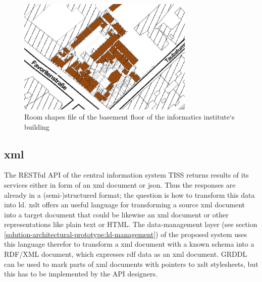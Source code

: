 \documentclass[draft,final]{vutinfth} %
\begin{document}
\begin{figure}[h]
    \centering
    \includegraphics[width=0.75\textwidth]{graphics/qgis-floor-plan-building-h-eg.png}
    \caption{Room shapes file of the basement floor of the informatics institute`s building}
    \label{fig:solution-data-acquisition:tuvienna-lib-gm-indoor}
\end{figure}

\subsection{\gls{xml}}
\label{solution-data-acquisition-xml}

The RESTful API of the central information system TISS returns results of its services  either in form of an \gls{xml} document or \gls{json}. Thus the responses are already in a (semi-)structured format; the question is how to transform this data into \gls{ld}. \gls{xslt} offers an useful language for transforming a source \gls{xml} document into a target document that could be likewise an \gls{xml} document or other representations like plain text or HTML.  The data-management layer (see section \ref{solution-architectural-prototype:ld-management}) of the proposed system uses this language therefor to transform a \gls{xml} document with a known schema into a RDF/XML document, which expresses \gls{rdf} data as an \gls{xml} document. GRDDL\cite{connolly_gleaning_2007} can be used to mark parts of \gls{xml} documents with pointers to \gls{xslt} stylesheets, but this has to be implemented by the API designers.
\end{document}
